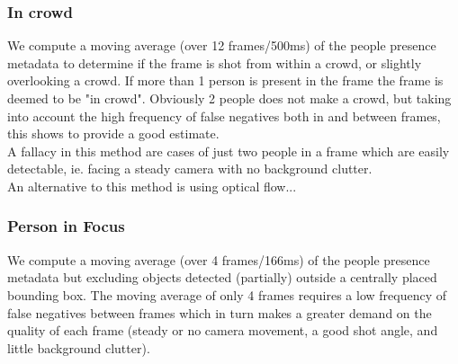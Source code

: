 \subsubsection{In crowd}
%
We compute a moving average (over 12 frames/500ms) of the people presence metadata to determine if the frame is shot from within a crowd, or slightly overlooking a crowd. If more than 1 person is present in the frame the frame is deemed to be "in crowd". Obviously 2 people does not make a crowd, but taking into account the high frequency of false negatives both in and between frames, this shows to provide a good estimate.\\
A fallacy in this method are cases of just two people in a frame which are easily detectable, ie. facing a steady camera with no background clutter.\\
An alternative to this method is using optical flow... %
%
\subsubsection{Person in Focus}
%
We compute a moving average (over 4 frames/166ms) of the people presence metadata but excluding objects detected (partially) outside a centrally placed bounding box. The moving average of only 4 frames requires a low frequency of false negatives between frames which in turn makes a greater demand on the quality of each frame (steady or no camera movement, a good shot angle, and little background clutter).
%
